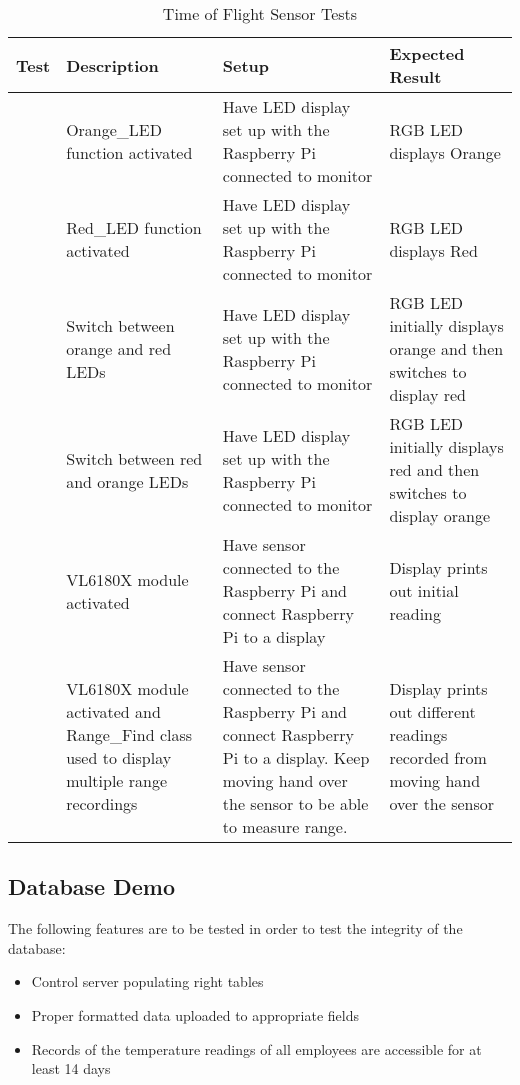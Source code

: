 \begin{table*}[htb]
\centering
\begin{tabular}{>{\centering\arraybackslash}m{0.75cm}|>{\centering\arraybackslash}m{4cm}|>{\centering\arraybackslash}m{4.5cm}|>{\centering\arraybackslash}m{4cm}}
\toprule
Test & Description & Setup & Expected Result \\
\midrule
1 & Orange\_LED function activated & Have LED display set up with the Raspberry
Pi connected to monitor & RGB LED displays Orange \\
\hline
2 & Red\_LED function activated & Have LED display set up with the Raspberry Pi
connected to monitor & RGB LED displays Red \\
\hline
3 & Switch between orange and red LEDs & Have LED display set up with the
Raspberry Pi connected to monitor & RGB LED initially displays orange and then
switches to display red \\
\hline
4 & Switch between red and orange LEDs & Have LED display set up with the
Raspberry Pi connected to monitor & RGB LED initially displays red and then
switches to display orange \\
\hline
5 & VL6180X module activated & Have sensor connected to the Raspberry Pi and
connect Raspberry Pi to a display & Display prints out initial reading \\
\hline
6 & VL6180X module activated and Range\_Find class used to display multiple
range recordings & Have sensor connected to the Raspberry Pi and connect
Raspberry Pi to a display. Keep moving hand over the sensor to be able to
measure range. & Display prints out different readings recorded from moving
hand over the sensor \\
\bottomrule
\end{tabular}
\caption{Time of Flight Sensor Tests}
\label{table:tof-tests}
\end{table*}

\subsection{Database Demo}

The following features are to be tested in order to test the integrity of the
database:

\begin{itemize}
    \item Control server populating right tables 
    \item Proper formatted data uploaded to appropriate fields
    \item Records of the temperature readings of all employees are accessible
          for at least 14 days
\end{itemize}

